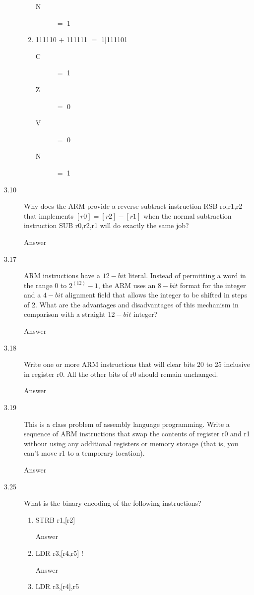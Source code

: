 \documentclass[letterpaper,10pt,titlepage]{article}
\begin{document}
\begin{description}
\begin{enumerate}
\begin{description}
            \item[N] $=$ 1
        \end{description}
        \item 111110 $+$ 111111 $=$ 1|111101
        \begin{description}
            \item[C] $=$ 1
            \item[Z] $=$ 0
            \item[V] $=$ 0
            \item[N] $=$ 1
        \end{description}
    \end{enumerate}
    \item[3.10] Why does the ARM provide a reverse subtract instruction RSB ro,r1,r2 that implements $[r0] = [r2] - [r1]$ when the normal subtraction instruction SUB r0,r2,r1 will do exactly the same job?
    
    Answer
    \item[3.17] ARM instructions have a $12-bit$ literal. Instead of permitting a word in the range 0 to $2^(12) - 1$, the ARM uses an $8-bit$ format for the integer and a $4-bit$ alignment field that allows the integer to be shifted in steps of 2. What are the advantages and disadvantages of this mechanism in comparison with a straight $12-bit$ integer?
    
    Answer
    \item[3.18] Write one or more ARM instructions that will clear bits 20 to 25 inclusive in register r0. All the other bits of r0 should remain unchanged.
    
    Answer
    \item[3.19] This is a class problem of assembly language programming. Write a sequence of ARM instructions that swap the contents of register r0 and r1 withour using any additional registers or memory storage (that is, you can't move r1 to a temporary location).
    
    Answer
    \item[3.25] What is the binary encoding of the following instructions?
    \begin{enumerate}
        \item STRB r1,[r2]
        
        Answer
        \item LDR r3,[r4,r5] !
        
        Answer
        \item LDR r3,[r4],r5
        

\end{enumerate}
\end{description}
\end{document}
